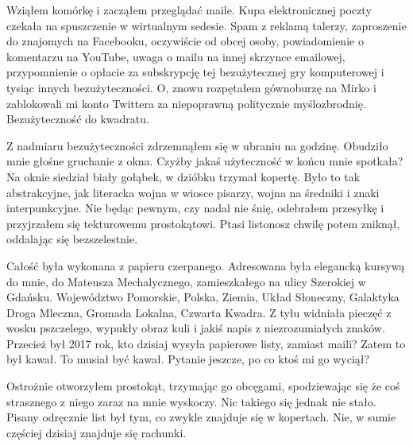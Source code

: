 Wziąłem komórkę i zacząłem przeglądać maile. Kupa elektronicznej poczty czekała na spuszczenie w wirtualnym sedesie.
Spam z reklamą talerzy, zaproszenie do znajomych na Facebooku, oczywiście od obcej osoby, powiadomienie o komentarzu na YouTube,
uwaga o mailu na innej skrzynce emailowej, przypomnienie o opłacie za subskrypcję tej bezużytecznej gry komputerowej i tysiąc innych bezużyteczności.
O, znowu rozpętałem gównoburzę na Mirko i zablokowali mi konto Twittera za niepoprawną politycznie myślozbrodnię.
Bezużyteczność do kwadratu.

Z nadmiaru bezużyteczności zdrzemnąłem się w ubraniu na godzinę. Obudziło mnie głośne gruchanie z okna.
Czyżby jakaś użyteczność w końcu mnie spotkała?
Na oknie siedział biały gołąbek, w dzióbku trzymał kopertę. Było to tak abstrakcyjne, jak literacka wojna w wiosce pisarzy, wojna na średniki i znaki interpunkcyjne.
Nie będąc pewnym, czy nadal nie śnię, odebrałem przesyłkę i przyjrzałem się tekturowemu prostokątowi.
Ptasi listonosz chwilę potem zniknął, oddalając się bezszelestnie.

Całość była wykonana z papieru czerpanego.
Adresowana była elegancką kursywą do mnie, do Mateusza Mechalycznego, zamieszkałego na ulicy Szerokiej w Gdańsku.
Województwo Pomorskie, Polska, Ziemia, Układ Słoneczny, Galaktyka Droga Mleczna, Gromada Lokalna, Czwarta Kwadra.
Z tyłu widniała pieczęć z wosku pszczelego, wypukły obraz kuli i jakiś napis z niezrozumiałych znaków.
Przecież był 2017 rok, kto dzisiaj wysyła papierowe listy, zamiast maili?
Zatem to był kawał. To musiał być kawał. Pytanie jeszcze, po co ktoś mi go wyciął?

Ostrożnie otworzyłem prostokąt, trzymając go obcęgami, spodziewając się że coś strasznego z niego zaraz na mnie wyskoczy.
Nic takiego się jednak nie stało.
Pisany odręcznie list był tym, co zwykle znajduje się w kopertach. Nie, w sumie częściej dzisiaj znajduje się rachunki.

